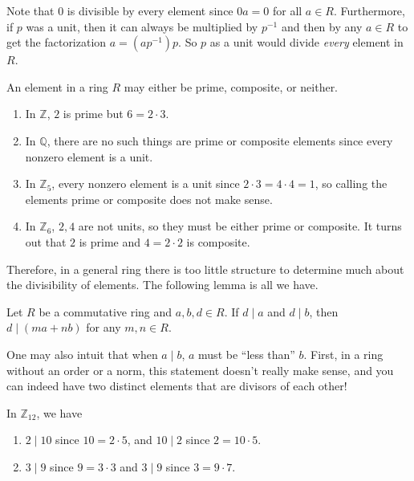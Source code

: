   Note that $0$ is divisible by every element since $0a = 0$ for all $a \in R$. Furthermore, if $p$ was a unit, then it can always be multiplied by $p^{-1}$ and then by any $a \in R$ to get the factorization $a = (a p^{-1}) p$. So $p$ as a unit would divide \textit{every} element in $R$. 

  \begin{example}
    An element in a ring $R$ may either be prime, composite, or neither. 
    \begin{enumerate}
      \item In $\mathbb{Z}$, $2$ is prime but $6 = 2 \cdot 3$. 
      \item In $\mathbb{Q}$, there are no such things are prime or composite elements since every nonzero element is a unit. 
      \item In $\mathbb{Z}_5$, every nonzero element is a unit since $2 \cdot 3 = 4 \cdot 4 = 1$, so calling the elements prime or composite does not make sense. 
      \item In $\mathbb{Z}_6$, $2, 4$ are not units, so they must be either prime or composite. It turns out that $2$ is prime and $4 = 2 \cdot 2$ is composite. 
    \end{enumerate}
  \end{example}

  Therefore, in a general ring there is too little structure to determine much about the divisibility of elements. The following lemma is all we have. 

  \begin{lemma}
    Let $R$ be a commutative ring and $a, b, d \in R$. If $d \mid a$ and $d \mid b$, then $d \mid (ma + nb)$ for any $m, n \in R$. 
  \end{lemma} 

  One may also intuit that when $a \mid b$, $a$ must be ``less than'' $b$. First, in a ring without an order or a norm, this statement doesn't really make sense, and you can indeed have two distinct elements that are divisors of each other! 

  \begin{example}
    In $\mathbb{Z}_{12}$, we have 
    \begin{enumerate}
      \item $2 \mid 10$ since $10 = 2 \cdot 5$, and $10 \mid 2$ since $2 = 10 \cdot 5$. 
      \item $3 \mid 9$ since $9 = 3 \cdot 3$ and $3 \mid 9$ since $3 = 9 \cdot 7$. 
    \end{enumerate}
  \end{example}

